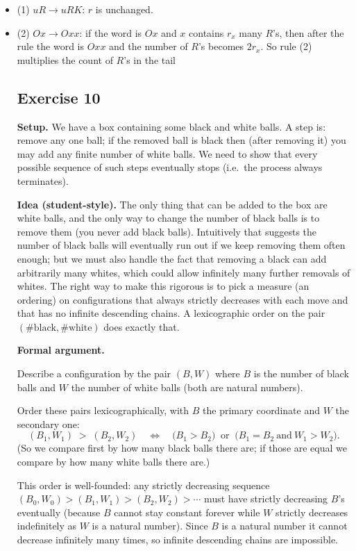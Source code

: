 \documentclass[12pt]{article}
\begin{document}
\begin{itemize}
  \item (1) \(uR\to uRK\): \(r\) is unchanged.
  \item (2) \(Ox\to Oxx\): if the word is \(Ox\) and \(x\) contains \(r_x\) many \(R\)'s, then after the rule the word is \(Oxx\) and the number of \(R\)'s becomes \(2r_x\). So rule (2) multiplies the count of \(R\)'s in the tail
\subsection*{Exercise 10}

\textbf{Setup.}  
We have a box containing some black and white balls. A step is: remove any one ball; if the removed ball is black then (after removing it) you may add any finite number of white balls. We need to show that every possible sequence of such steps eventually stops (i.e.\ the process always terminates).

\bigskip

\textbf{Idea (student-style).}  
The only thing that can be added to the box are white balls, and the only way to change the number of black balls is to remove them (you never add black balls). Intuitively that suggests the number of black balls will eventually run out if we keep removing them often enough; but we must also handle the fact that removing a black can add arbitrarily many whites, which could allow infinitely many further removals of whites. The right way to make this rigorous is to pick a measure (an ordering) on configurations that always strictly decreases with each move and that has no infinite descending chains. A lexicographic order on the pair \((\#\text{black},\#\text{white})\) does exactly that.

\bigskip

\textbf{Formal argument.}

Describe a configuration by the pair \((B,W)\) where \(B\) is the number of black balls and \(W\) the number of white balls (both are natural numbers).

Order these pairs lexicographically, with \(B\) the primary coordinate and \(W\) the secondary one:
\[
(B_1,W_1) \;>\; (B_2,W_2)
\quad\Longleftrightarrow\quad
\big(B_1>B_2\big)\ \text{ or }\ \big(B_1=B_2\ \text{and}\ W_1>W_2\big).
\]
(So we compare first by how many black balls there are; if those are equal we compare by how many white balls there are.)

This order is well-founded: any strictly decreasing sequence \((B_0,W_0) > (B_1,W_1) > (B_2,W_2) > \cdots\) must have strictly decreasing \(B\)'s eventually (because \(B\) cannot stay constant forever while \(W\) strictly decreases indefinitely as \(W\) is a natural number). Since \(B\) is a natural number it cannot decrease infinitely many times, so infinite descending chains are impossible.


\end{itemize}
\end{document}

